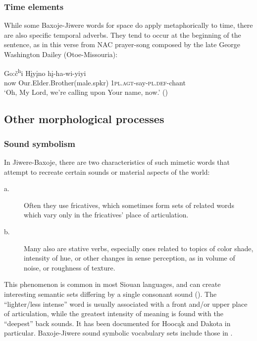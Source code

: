 \documentclass[output=paper]{LSP/langsci}
\begin{document}
\subsubsection{Time elements}  While some Baxoje-Jiwere words for space do apply metaphorically to time, there are also specific temporal adverbs.  They tend to occur at the beginning of the sentence, as in this verse from NAC prayer-song composed by the late George Washington Dailey (Otoe-Missouria):

\ea \gll Go:\v{c}\textsuperscript{h}i   H\k{i}y\k{i}no    h\k{i}-ha-wi-yiyi \\
now     Our.Elder.Brother(male.spkr) \textsc{1pl.agt}-say-\textsc{pl.def}-chant	\\
\glt `Oh, My Lord, we're calling upon Your name, now.'	(\citealt{Davidson1997})
\z

\subsection{Other morphological processes}

\subsubsection{Sound symbolism}  

In Jiwere-Baxoje, there are two characteristics of such mimetic words that attempt to recreate certain sounds or material aspects of the world:   

\begin{description}
\item[a.] Often they use fricatives,  which sometimes form sets of related words which vary only in the fricatives' place of articulation.   
\item[b.] Many also are stative verbs, especially ones related to topics of color shade, intensity of hue, or other changes in sense perception, as in volume of noise, or roughness of texture. 
\end{description}

 This phenomenon is common in most Siouan languages, and can create interesting semantic sets differing by a single consonant sound (\citealt[468-469]{Rankin2005}). The ``lighter/less intense'' word is usually associated with a front and/or upper place of articulation, while the greatest intensity of meaning is found with the ``deepest'' back sounds.  It has been documented for Hooc\k{a}k and Dakota in particular.  Baxoje-Jiwere sound symbolic vocabulary sets include those in . 
 
\end{document}
